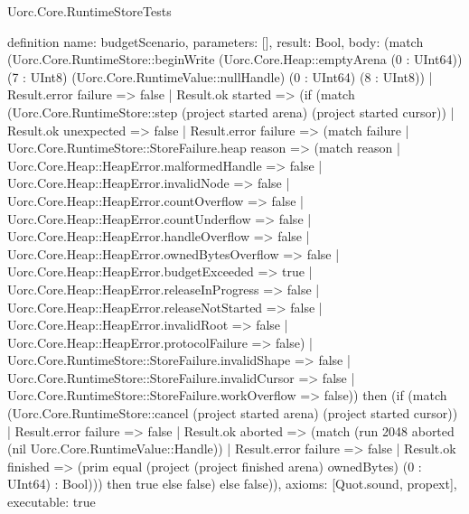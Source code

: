 \begin{lexlean}{Uorc.Core.RuntimeStoreTests}
\begin{semanticmodule}
definition{
  name: budgetScenario,
  parameters: [],
  result: Bool,
  body: (match (Uorc.Core.RuntimeStore::beginWrite (Uorc.Core.Heap::emptyArena (0 : UInt64)) (7 : UInt8) (Uorc.Core.RuntimeValue::nullHandle) (0 : UInt64) (8 : UInt8))
    | Result.error failure => false
    | Result.ok started => (if (match (Uorc.Core.RuntimeStore::step (project started arena) (project started cursor))
      | Result.ok unexpected => false
      | Result.error failure => (match failure
        | Uorc.Core.RuntimeStore::StoreFailure.heap reason => (match reason
          | Uorc.Core.Heap::HeapError.malformedHandle => false
          | Uorc.Core.Heap::HeapError.invalidNode => false
          | Uorc.Core.Heap::HeapError.countOverflow => false
          | Uorc.Core.Heap::HeapError.countUnderflow => false
          | Uorc.Core.Heap::HeapError.handleOverflow => false
          | Uorc.Core.Heap::HeapError.ownedBytesOverflow => false
          | Uorc.Core.Heap::HeapError.budgetExceeded => true
          | Uorc.Core.Heap::HeapError.releaseInProgress => false
          | Uorc.Core.Heap::HeapError.releaseNotStarted => false
          | Uorc.Core.Heap::HeapError.invalidRoot => false
          | Uorc.Core.Heap::HeapError.protocolFailure => false)
        | Uorc.Core.RuntimeStore::StoreFailure.invalidShape => false
        | Uorc.Core.RuntimeStore::StoreFailure.invalidCursor => false
        | Uorc.Core.RuntimeStore::StoreFailure.workOverflow => false)) then (if (match (Uorc.Core.RuntimeStore::cancel (project started arena) (project started cursor))
      | Result.error failure => false
      | Result.ok aborted => (match (run 2048 aborted (nil Uorc.Core.RuntimeValue::Handle))
        | Result.error failure => false
        | Result.ok finished => (prim equal (project (project finished arena) ownedBytes) (0 : UInt64) : Bool))) then true else false) else false)),
  axioms: [Quot.sound, propext],
  executable: true
}


\end{semanticmodule}
\end{lexlean}
